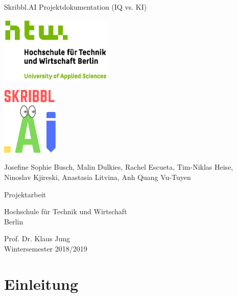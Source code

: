 \documentclass[11pt]{article}
\begin{document}
\begin{titlepage}
   \begin{center}
       \vspace*{1cm}

       \Huge
       Skribbl.AI Projektdokumentation (IQ vs. KI)
       \vspace{1.5cm}

       \includegraphics[width=0.4\textwidth]{images/logo_htw.jpg}

       \vspace{1.0cm}
       \includegraphics[width=0.2\textwidth]{images/logo_skribbl.png}
       \vspace{1.0cm}

       \LARGE

       Josefine Sophie Busch, Malin Dulkies, Rachel Escueta, Tim-Niklas Heise, Ninoslav Kjireski, Anastasia Litvina, Anh Quang Vu-Tuyen

       \vfill

       Projektarbeit \\

       \vspace{0.8cm}

       Hochschule für Technik und Wirtschaft\\
       Berlin\\

   \end{center}
\end{titlepage}

       Prof. Dr. Klaus Jung\\
       Wintersemester 2018/2019\\
\pagebreak
\tableofcontents
\pagebreak
\listoftables
\listoffigures
\pagebreak

\section{Einleitung}
\label{chap: Einleitung}
\end{document}
